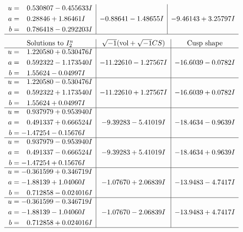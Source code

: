 \documentclass[1p]{elsarticle_modified}
\theoremstyle{definition}
\newcommand{\I}{\sqrt{-1}}
\begin{document}
$$\begin{array}{c|c|c}
\begin{aligned}
u &= \phantom{-}0.530807 - 0.455633 I \\
a &= \phantom{-}0.28846 + 1.86461 I \\
b &= \phantom{-}0.786418 - 0.292203 I\end{aligned}
 & -0.88641 - 1.48655 I & -9.46143 + 3.25797 I\\
 \hline 
 \end{array}$$\newpage$$\begin{array}{c|c|c}  
\text{Solutions to }I^u_{2}& \I (\text{vol} + \sqrt{-1}CS) & \text{Cusp shape}\\
 \hline 
\begin{aligned}
u &= \phantom{-}1.220580 + 0.530476 I \\
a &= \phantom{-}0.592322 - 1.173540 I \\
b &= \phantom{-}1.55624 - 0.04997 I\end{aligned}
 & -11.22610 - 1.27567 I & -16.6039 - 0.0782 I \\ \hline\begin{aligned}
u &= \phantom{-}1.220580 - 0.530476 I \\
a &= \phantom{-}0.592322 + 1.173540 I \\
b &= \phantom{-}1.55624 + 0.04997 I\end{aligned}
 & -11.22610 + 1.27567 I & -16.6039 + 0.0782 I \\ \hline\begin{aligned}
u &= \phantom{-}0.937979 + 0.953940 I \\
a &= \phantom{-}0.491337 + 0.666524 I \\
b &= -1.47254 - 0.15676 I\end{aligned}
 & -9.39283 - 5.41019 I & -18.4634 - 0.9639 I \\ \hline\begin{aligned}
u &= \phantom{-}0.937979 - 0.953940 I \\
a &= \phantom{-}0.491337 - 0.666524 I \\
b &= -1.47254 + 0.15676 I\end{aligned}
 & -9.39283 + 5.41019 I & -18.4634 + 0.9639 I \\ \hline\begin{aligned}
u &= -0.361599 + 0.346719 I \\
a &= -1.88139 + 1.04060 I \\
b &= \phantom{-}0.712858 - 0.024016 I\end{aligned}
 & -1.07670 + 2.06839 I & -13.9483 - 4.7417 I \\ \hline\begin{aligned}
u &= -0.361599 - 0.346719 I \\
a &= -1.88139 - 1.04060 I \\
b &= \phantom{-}0.712858 + 0.024016 I\end{aligned}
 & -1.07670 - 2.06839 I & -13.9483 + 4.7417 I\\
 \hline 
 \end{array}$$\newpage
\end{document}
